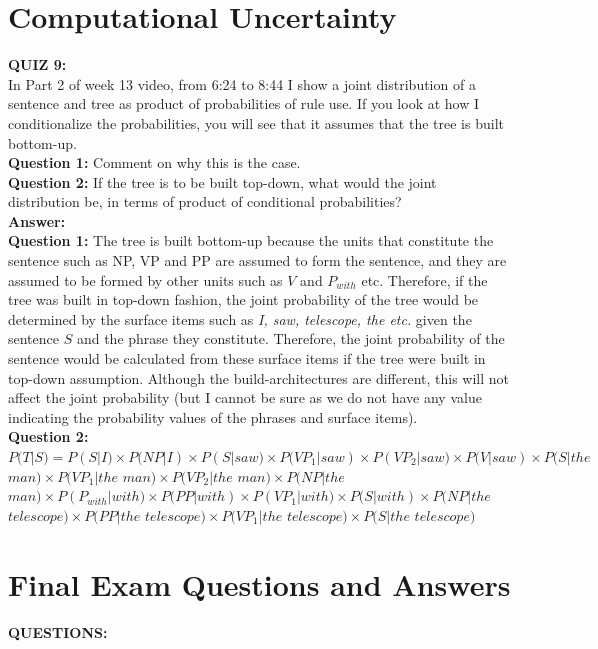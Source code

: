 \documentclass[12pt,a4paper]{article}
\begin{document}
\clearpage

\section{Computational Uncertainty}
\noindent \textbf{\Large{QUIZ 9:}}\\
In Part 2 of week 13 video, from 6:24 to 8:44 I show a joint distribution of a sentence and tree as product of probabilities of rule use. If you look at how I conditionalize the probabilities, you will see that it assumes that the tree is built bottom-up.\\

\noindent \textbf{Question 1:} Comment on why this is the case.\\
\noindent \textbf{Question 2:} If the tree is to be built top-down, what would the joint distribution be, in terms of product of conditional probabilities?\\

\noindent \textbf{\Large{Answer:}}\\

\noindent \textbf{Question 1:} The tree is built bottom-up because the units that constitute the sentence such as NP, VP and PP are assumed to form the sentence, and they are assumed to be formed by other units such as $V$ and $P_{with}$ etc. Therefore, if the tree was built in top-down fashion, the joint probability of the tree would be determined by the surface items such as \textit{I, saw, telescope, the etc.} given the sentence $S$ and the phrase they constitute. Therefore, the joint probability of the sentence would be calculated from these surface items if the tree were built in top-down assumption. Although the build-architectures are different, this will not affect the joint probability (but I cannot be sure as we do not have any value indicating the probability values of the phrases and surface items).\\

\noindent \textbf{Question 2:} $P(T|S)=P(S|I)\times P(NP|I)\times P(S|saw)\times P(VP_{1}|saw)\times P(VP_{2}|saw)\times P(V|saw)\times P(S|the$ $man)\times P(VP_{1}|the$ $man)\times P(VP_{2}|the$ $man)\times P(NP|the$ $man)\times P(P_{with}|with)\times P(PP|with)\times P(VP_{1}|with)\times P(S|with)\times P(NP|the$ $telescope)\times P(PP|the$ $telescope)\times P(VP_{1}|the$ $telescope)\times P(S|the$ $telescope)$

\clearpage

\section{Final Exam Questions and Answers}
\textbf{QUESTIONS:}\\
\end{document}

